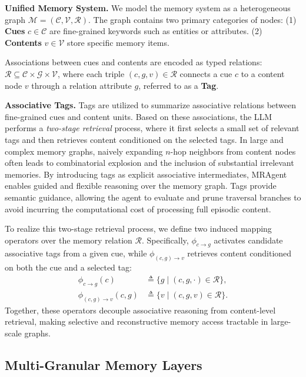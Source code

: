 \documentclass{llmxive}
\begin{document}
\textbf{Unified Memory System.}
We model the memory system as a heterogeneous graph $\mathcal{M} = (\mathcal{C}, \mathcal{V}, \mathcal{R})$. The graph contains two primary categories of nodes:
(1) \textbf{Cues} $c \in \mathcal{C}$ are fine-grained keywords such as entities or attributes. 
(2) \textbf{Contents} $v \in \mathcal{V}$ store specific memory items. 

Associations between cues and contents are encoded as typed relations:
$\mathcal{R} \subseteq \mathcal{C} \times \mathcal{G} \times \mathcal{V}$,
where each triple $(c, g, v) \in \mathcal{R}$ connects a cue $c$ to a content node $v$ through a relation attribute $g$, referred to as a \textbf{Tag}.

\textbf{Associative Tags.} 
Tags are utilized to summarize associative relations between fine-grained cues and content units.
Based on these associations, the LLM performs a \emph{two-stage retrieval} process, where it first selects a small set of relevant tags and then retrieves content conditioned on the selected tags.
In large and complex memory graphs, naively expanding $n$-hop neighbors from content nodes often leads to combinatorial explosion and the inclusion of substantial irrelevant memories.
By introducing tags as explicit associative intermediates, MRAgent enables guided and flexible reasoning over the memory graph.
Tags provide semantic guidance, allowing the agent to evaluate and prune traversal branches to avoid incurring the computational cost of processing full episodic content.

To realize this two-stage retrieval process, we define two induced mapping operators over the memory relation $\mathcal{R}$.
Specifically, $\phi_{c \rightarrow g}$ activates candidate associative tags from a given cue, while $\phi_{(c,g) \rightarrow v}$ retrieves content conditioned on both the cue and a selected tag:
\begin{equation}
\begin{aligned}
\phi_{c \rightarrow g}(c)
&\triangleq \{ g \mid (c,g,\cdot) \in \mathcal{R} \}, \\
\phi_{(c,g) \rightarrow v}(c,g)
&\triangleq \{ v \mid (c,g,v) \in \mathcal{R} \}.
\label{eq:phi}
\end{aligned}
\end{equation}
Together, these operators decouple associative reasoning from content-level retrieval, making selective and reconstructive memory access tractable in large-scale graphs.

\subsection{Multi-Granular Memory Layers}
\label{subsec:layers}
\end{document}
